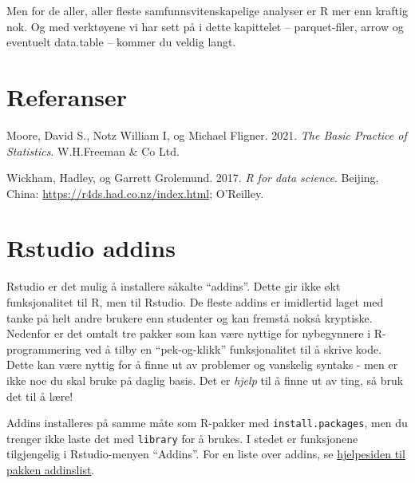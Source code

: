 \documentclass[
  norsk,
  letterpaper,
  DIV=11,
  numbers=noendperiod]{scrreprt}
\newlength{\cslhangindent}
\newenvironment{CSLReferences}[2] %
 {\begin{list}{}{%
  \setlength{\itemindent}{0pt}
  \setlength{\leftmargin}{0pt}
  \setlength{\parsep}{0pt}
  \ifodd #1
   \setlength{\leftmargin}{\cslhangindent}
   \setlength{\itemindent}{-1\cslhangindent}
  \fi
  \setlength{\itemsep}{#2\baselineskip}}}
 {\end{list}}
\theoremstyle{definition}
\theoremstyle{remark}
\begin{document}
Men for de aller, aller fleste samfunnsvitenskapelige analyser er R mer
enn kraftig nok. Og med verktøyene vi har sett på i dette kapittelet --
parquet-filer, arrow og eventuelt data.table -- kommer du veldig langt.


\chapter*{Referanser}\label{referanser}


\label{refs}
\begin{CSLReferences}{1}{0}
Moore, David S., Notz William I, og Michael Fligner. 2021. \emph{The
Basic Practice of Statistics}. W.H.Freeman \& Co Ltd.

Wickham, Hadley, og Garrett Grolemund. 2017. \emph{R for data science}.
Beijing, China: \url{https://r4ds.had.co.nz/index.html}; O'Reilley.

\end{CSLReferences}

\cleardoublepage
{}
{}
\appendix

\chapter{Rstudio addins}\label{rstudio-addins}

Rstudio er det mulig å installere såkalte ``addins''. Dette gir ikke økt
funksjonalitet til R, men til Rstudio. De fleste addins er imidlertid
laget med tanke på helt andre brukere enn studenter og kan fremstå nokså
kryptiske. Nedenfor er det omtalt tre pakker som kan være nyttige for
nybegynnere i R-programmering ved å tilby en ``pek-og-klikk''
funksjonalitet til å skrive kode. Dette kan være nyttig for å finne ut
av problemer og vanskelig syntaks - men er ikke noe du skal bruke på
daglig basis. Det er \emph{hjelp} til å finne ut av ting, så bruk det
til å lære!

Addins installeres på samme måte som R-pakker med
\texttt{install.packages}, men du trenger ikke laste det med
\texttt{library} for å brukes. I stedet er funksjonene tilgjengelig i
Rstudio-menyen ``Addins''. For en liste over addins, se
\href{https://cran.r-project.org/web/packages/addinslist/readme/README.html\#addinslist-table}{hjelpesiden
til pakken addinslist}.
\end{document}
